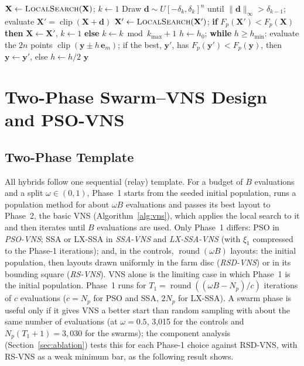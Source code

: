 \begin{algorithm}[!t]
\caption{Basic VNS from an incumbent $\mathbf X$ (until the budget is used; returns the best layout evaluated)}
\label{alg:vns}
\small
\begin{algorithmic}[1]
\State $\mathbf X\gets\textsc{LocalSearch}(\mathbf X)$; $k\gets1$
\Loop
    \State Draw $\mathbf d\sim U[-\delta_k,\delta_k]^n$ until $\lVert\mathbf d\rVert_\infty>\delta_{k-1}$; evaluate $\mathbf X'=\operatorname{clip}(\mathbf X+\mathbf d)$ 
    \State $\mathbf X'\gets\textsc{LocalSearch}(\mathbf X')$; \textbf{if} $F_p(\mathbf X')<F_p(\mathbf X)$ \textbf{then} $\mathbf X\gets\mathbf X'$, $k\gets1$ \textbf{else} $k\gets k\bmod k_{\max}+1$
\EndLoop
{} 
    \State $h\gets h_0$; \textbf{while} $h\ge h_{\min}$: evaluate the $2n$ points $\operatorname{clip}(\mathbf y\pm h\,\mathbf e_m)$; if the best, $\mathbf y'$, has $F_p(\mathbf y')<F_p(\mathbf y)$, then $\mathbf y\gets\mathbf y'$, else $h\gets h/2$
    \State \Return $\mathbf y$
\EndFunction
\end{algorithmic}
\end{algorithm}

\section{Two-Phase Swarm--VNS Design and PSO-VNS}
\label{sec:hybrid}

\subsection{Two-Phase Template}
\label{sec:template}
All hybrids follow one sequential (relay) template. For a budget of $B$ evaluations and a split $\omega\in(0,1)$, Phase~1 starts from the seeded initial population, runs a population method for about $\omega B$ evaluations and passes its best layout to Phase~2, the basic VNS (Algorithm~\ref{alg:vns}), which applies the local search to it and then iterates until $B$ evaluations are used. Only Phase~1 differs: PSO in \emph{PSO-VNS}; SSA or LX-SSA in \emph{SSA-VNS} and \emph{LX-SSA-VNS} (with $\xi_1$ compressed to the Phase-1 iterations); and, in the controls, $\operatorname{round}(\omega B)$ layouts: the initial population, then layouts drawn uniformly in the farm disc (\emph{RSD-VNS}) or in its bounding square (\emph{RS-VNS}). VNS alone is the limiting case in which Phase~1 is the initial population. Phase~1 runs for $T_1=\operatorname{round}((\omega B-N_p)/c)$ iterations of $c$ evaluations ($c=N_p$ for PSO and SSA, $2N_p$ for LX-SSA). A swarm phase is useful only if it gives VNS a better start than random sampling with about the same number of evaluations (at $\omega=0.5$, 3,015 for the controls and $N_p(T_1+1)=3{,}030$ for the swarms); the component analysis (Section~\ref{sec:ablation}) tests this for each Phase-1 choice against RSD-VNS, with RS-VNS as a weak minimum bar, as the following result shows.

